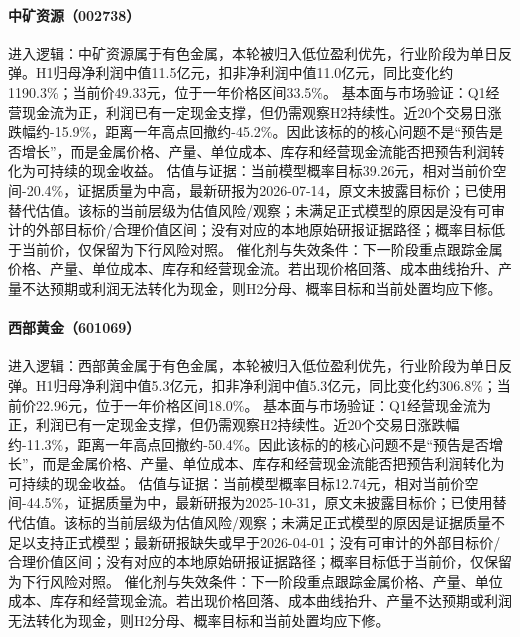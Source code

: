\paragraph{中矿资源（002738）}
进入逻辑：中矿资源属于有色金属，本轮被归入低位盈利优先，行业阶段为单日反弹。H1归母净利润中值11.5亿元，扣非净利润中值11.0亿元，同比变化约1190.3\%；当前价49.33元，位于一年价格区间33.5\%。
基本面与市场验证：Q1经营现金流为正，利润已有一定现金支撑，但仍需观察H2持续性。近20个交易日涨跌幅约-15.9\%，距离一年高点回撤约-45.2\%。因此该标的的核心问题不是“预告是否增长”，而是金属价格、产量、单位成本、库存和经营现金流能否把预告利润转化为可持续的现金收益。
估值与证据：当前模型概率目标39.26元，相对当前价空间-20.4\%，证据质量为中高，最新研报为2026-07-14，原文未披露目标价；已使用替代估值。该标的当前层级为估值风险/观察；未满足正式模型的原因是没有可审计的外部目标价/合理价值区间；没有对应的本地原始研报证据路径；概率目标低于当前价，仅保留为下行风险对照。
催化剂与失效条件：下一阶段重点跟踪金属价格、产量、单位成本、库存和经营现金流。若出现价格回落、成本曲线抬升、产量不达预期或利润无法转化为现金，则H2分母、概率目标和当前处置均应下修。

\paragraph{西部黄金（601069）}
进入逻辑：西部黄金属于有色金属，本轮被归入低位盈利优先，行业阶段为单日反弹。H1归母净利润中值5.3亿元，扣非净利润中值5.3亿元，同比变化约306.8\%；当前价22.96元，位于一年价格区间18.0\%。
基本面与市场验证：Q1经营现金流为正，利润已有一定现金支撑，但仍需观察H2持续性。近20个交易日涨跌幅约-11.3\%，距离一年高点回撤约-50.4\%。因此该标的的核心问题不是“预告是否增长”，而是金属价格、产量、单位成本、库存和经营现金流能否把预告利润转化为可持续的现金收益。
估值与证据：当前模型概率目标12.74元，相对当前价空间-44.5\%，证据质量为中，最新研报为2025-10-31，原文未披露目标价；已使用替代估值。该标的当前层级为估值风险/观察；未满足正式模型的原因是证据质量不足以支持正式模型；最新研报缺失或早于2026-04-01；没有可审计的外部目标价/合理价值区间；没有对应的本地原始研报证据路径；概率目标低于当前价，仅保留为下行风险对照。
催化剂与失效条件：下一阶段重点跟踪金属价格、产量、单位成本、库存和经营现金流。若出现价格回落、成本曲线抬升、产量不达预期或利润无法转化为现金，则H2分母、概率目标和当前处置均应下修。

